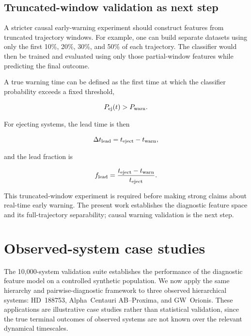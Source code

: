 \documentclass[12pt,a4paper]{article}
\newcommand{\Pej}{P_{\rm ej}}
\begin{document}
\subsection{Truncated-window validation as next step}
\label{sec:truncated_window_next}

A stricter causal early-warning experiment should construct features from truncated trajectory windows. For example, one can build separate datasets using only the first 10\%, 20\%, 30\%, and 50\% of each trajectory. The classifier would then be trained and evaluated using only those partial-window features while predicting the final outcome.

A true warning time can be defined as the first time at which the classifier probability exceeds a fixed threshold,

\begin{equation}
    \Pej(t) > P_{\rm warn}.
\end{equation}

For ejecting systems, the lead time is then

\begin{equation}
    \Delta t_{\rm lead}
    =
    t_{\rm eject}-t_{\rm warn},
\end{equation}

and the lead fraction is

\begin{equation}
    f_{\rm lead}
    =
    \frac{t_{\rm eject}-t_{\rm warn}}{t_{\rm eject}}.
\end{equation}

This truncated-window experiment is required before making strong claims about real-time early warning. The present work establishes the diagnostic feature space and its full-trajectory separability; causal warning validation is the next step.

\section{Observed-system case studies}
\label{sec:case_studies}

The 10,000-system validation suite establishes the performance of the diagnostic feature model on a controlled synthetic population. We now apply the same hierarchy and pairwise-diagnostic framework to three observed hierarchical systems: HD~188753, Alpha~Centauri AB--Proxima, and GW~Orionis. These applications are illustrative case studies rather than statistical validation, since the true terminal outcomes of observed systems are not known over the relevant dynamical timescales.
\end{document}
